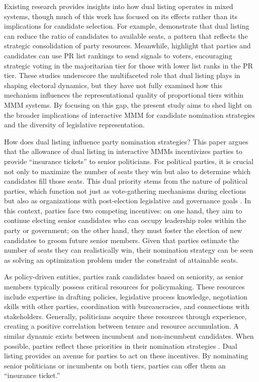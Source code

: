 \documentclass[a4paper, 11pt]{article}
\begin{document}
Existing research provides insights into how dual listing operates in mixed systems, though much of this work has focused on its effects rather than its implications for candidate selection. For example, \citet{mckeanJapansNewElectoral2000} demonstrate that dual listing can reduce the ratio of candidates to available seats, a pattern that reflects the strategic consolidation of party resources. Meanwhile, \citet{kraussReverseContaminationBurning2012} highlight that parties and candidates can use PR list rankings to send signals to voters, encouraging strategic voting in the majoritarian tier for those with lower list ranks in the PR tier. These studies underscore the multifaceted role that dual listing plays in shaping electoral dynamics, but they have not fully examined how this mechanism influences the representational quality of proportional tiers within MMM systems. By focusing on this gap, the present study aims to shed light on the broader implications of interactive MMM for candidate nomination strategies and the diversity of legislative representation.

How does dual listing influence party nomination strategies? This paper argues that the allowance of dual listing in interactive MMMs incentivizes parties to provide “insurance tickets” to senior politicians. For political parties, it is crucial not only to maximize the number of seats they win but also to determine which candidates fill those seats. This dual priority stems from the nature of political parties, which function not just as vote-gathering mechanisms during elections but also as organizations with post-election legislative and governance goals \citep{matakosElectoralInstitutionsIntraparty2024}. In this context, parties face two competing incentives: on one hand, they aim to continue electing senior candidates who can occupy leadership roles within the party or government; on the other hand, they must foster the election of new candidates to groom future senior members. Given that parties estimate the number of seats they can realistically win, their nomination strategy can be seen as solving an optimization problem under the constraint of attainable seats.

As policy-driven entities, parties rank candidates based on seniority, as senior members typically possess critical resources for policymaking. These resources include expertise in drafting policies, legislative process knowledge, negotiation skills with other parties, coordination with bureaucracies, and connections with stakeholders. Generally, politicians acquire these resources through experience, creating a positive correlation between tenure and resource accumulation. A similar dynamic exists between incumbent and non-incumbent candidates. When possible, parties reflect these priorities in their nomination strategies \citep[p.1085]{reedNominationProcessJapans1995}. Dual listing provides an avenue for parties to act on these incentives. By nominating senior politicians or incumbents on both tiers, parties can offer them an “insurance ticket.”
\end{document}
